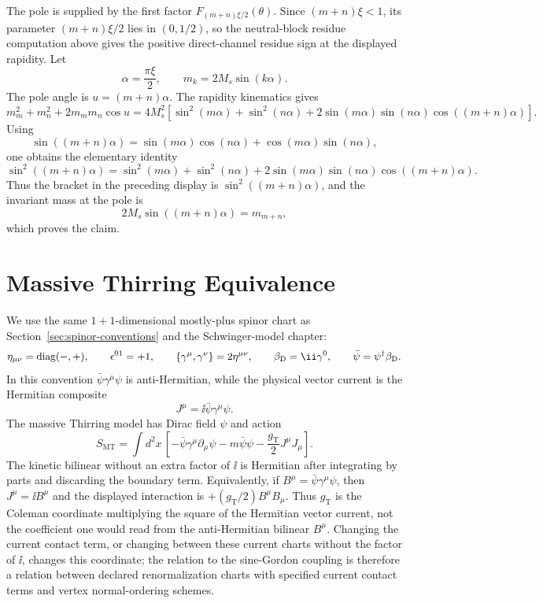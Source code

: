 The pole is supplied by the first factor
\(F_{(m+n)\xi/2}(\theta)\).  Since \((m+n)\xi<1\), its parameter
\((m+n)\xi/2\) lies in \((0,1/2)\), so the neutral-block residue computation
above gives the positive direct-channel residue sign at the displayed
rapidity.  Let
\[
  \alpha=\frac{\pi\xi}{2},
  \qquad
  m_k=2M_s\sin(k\alpha).
\]
The pole angle is \(u=(m+n)\alpha\).  The rapidity kinematics gives
\[
  m_m^2+m_n^2+2m_m m_n\cos u
  =
  4M_s^2\left[
  \sin^2(m\alpha)+\sin^2(n\alpha)
  +2\sin(m\alpha)\sin(n\alpha)\cos((m+n)\alpha)
  \right].
\]
Using
\[
  \sin((m+n)\alpha)
  =
  \sin(m\alpha)\cos(n\alpha)+\cos(m\alpha)\sin(n\alpha),
\]
one obtains the elementary identity
\[
  \sin^2((m+n)\alpha)
  =
  \sin^2(m\alpha)+\sin^2(n\alpha)
  +2\sin(m\alpha)\sin(n\alpha)\cos((m+n)\alpha).
\]
Thus the bracket in the preceding display is \(\sin^2((m+n)\alpha)\), and
the invariant mass at the pole is
\[
  2M_s\sin((m+n)\alpha)=m_{m+n},
\]
which proves the claim.

\section{Massive Thirring Equivalence}
\label{sec:sine-gordon-massive-thirring-equivalence}

We use the same \(1+1\)-dimensional mostly-plus spinor chart as
Section~\ref{sec:spinor-conventions} and the Schwinger-model chapter:
\[
  \eta_{\mu\nu}=\operatorname{diag}(-,+),
  \qquad
  \epsilon^{01}=+1,
  \qquad
  \{\gamma^\mu,\gamma^\nu\}=2\eta^{\mu\nu},
  \qquad
  \beta_{\rm D}=\ii\gamma^0,
  \qquad
  \bar\psi=\psi^\dagger\beta_{\rm D}.
\]
In this convention
\(\bar\psi\gamma^\mu\psi\) is anti-Hermitian, while the physical vector
current is the Hermitian composite
\begin{equation}
  J^\mu=\ii\bar\psi\gamma^\mu\psi .
  \label{eq:sg-thirring-hermitian-current}
\end{equation}
The massive Thirring model has Dirac field \(\psi\) and action
\[
  S_{\mathrm{MT}}
  =
  \int d^2x\,
  \left[
  -\bar\psi\gamma^\mu\partial_\mu\psi
  -m\bar\psi\psi
  -\frac{g_{\mathrm{T}}}{2}
  J^\mu J_\mu
  \right].
\]
The kinetic bilinear without an extra factor of \(\ii\) is Hermitian after
integrating by parts and discarding the boundary term.  Equivalently, if
\(B^\mu=\bar\psi\gamma^\mu\psi\), then \(J^\mu=\ii B^\mu\) and the displayed
interaction is \(+(g_{\mathrm T}/2)B^\mu B_\mu\).  Thus \(g_{\mathrm T}\) is
the Coleman coordinate multiplying the square of the Hermitian vector current,
not the coefficient one would read from the anti-Hermitian bilinear \(B^\mu\).
Changing the current contact term, or changing between these current charts
without the factor of \(\ii\), changes this coordinate; the relation to the
sine-Gordon coupling is therefore a relation between declared renormalization
charts with specified current contact terms and vertex normal-ordering schemes.

